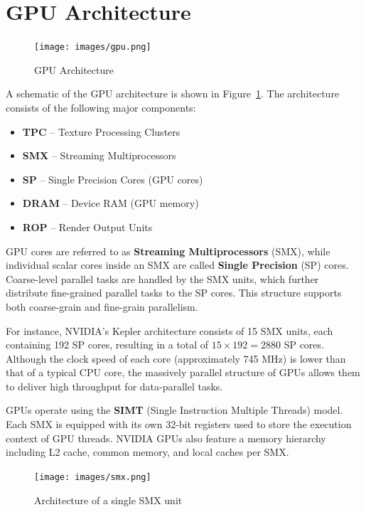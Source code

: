 \documentclass[12pt]{book}
\begin{document}
\section{GPU Architecture}

\begin{figure}[H]
    \centering
    \texttt{[image: images/gpu.png]}
    \caption{GPU Architecture}
    \label{fig:gpu}
\end{figure}

A schematic of the GPU architecture is shown in Figure~\ref{fig:gpu}. The architecture consists of the following major components:
\begin{itemize}
    \item \textbf{TPC} – Texture Processing Clusters
    \item \textbf{SMX} – Streaming Multiprocessors
    \item \textbf{SP} – Single Precision Cores (GPU cores)
    \item \textbf{DRAM} – Device RAM (GPU memory)
    \item \textbf{ROP} – Render Output Units
\end{itemize}

GPU cores are referred to as \textbf{Streaming Multiprocessors} (SMX), while individual scalar cores inside an SMX are called \textbf{Single Precision} (SP) cores. Coarse-level parallel tasks are handled by the SMX units, which further distribute fine-grained parallel tasks to the SP cores. This structure supports both coarse-grain and fine-grain parallelism.

For instance, NVIDIA's Kepler architecture consists of 15 SMX units, each containing 192 SP cores, resulting in a total of $15 \times 192 = 2880$ SP cores. Although the clock speed of each core (approximately 745 MHz) is lower than that of a typical CPU core, the massively parallel structure of GPUs allows them to deliver high throughput for data-parallel tasks.

GPUs operate using the \textbf{SIMT} (Single Instruction Multiple Threads) model. Each SMX is equipped with its own 32-bit registers used to store the execution context of GPU threads. NVIDIA GPUs also feature a memory hierarchy including L2 cache, common memory, and local caches per SMX.

\begin{figure}[H]
    \centering
    \texttt{[image: images/smx.png]}
    \caption{Architecture of a single SMX unit}
    \label{fig:smx}
\end{figure}
\end{document}
